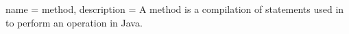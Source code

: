 {
    name = method,
    description = {A method is a compilation of statements used in to perform an operation in Java.} 
}
